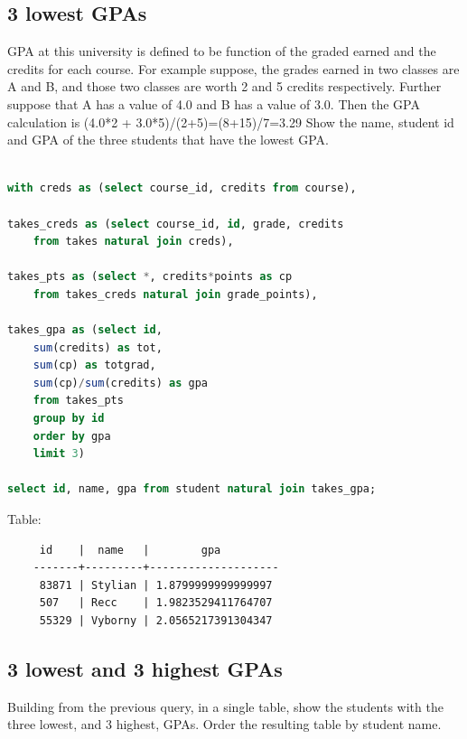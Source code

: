 \documentclass[11pt, oneside]{amsart}   	%
\begin{document}
\subsection{3 lowest GPAs}

GPA at this university is defined to be function of the graded earned and the credits for each course. For example suppose, the grades earned in two classes are A and B, and those two classes are worth 2 and 5 credits respectively. Further suppose that A has a value of 4.0 and B has a value of 3.0. Then the GPA calculation is (4.0*2 + 3.0*5)/(2+5)=(8+15)/7=3.29 Show the name, student id and GPA of the three students that have the lowest GPA. 

\begin{lstlisting}[language=SQL]

with creds as (select course_id, credits from course),

takes_creds as (select course_id, id, grade, credits 
    from takes natural join creds), 

takes_pts as (select *, credits*points as cp 
    from takes_creds natural join grade_points),

takes_gpa as (select id, 
    sum(credits) as tot, 
    sum(cp) as totgrad, 
    sum(cp)/sum(credits) as gpa 
    from takes_pts 
    group by id
    order by gpa
    limit 3)

select id, name, gpa from student natural join takes_gpa;

\end{lstlisting}

Table: 
\begin{verbatim}
     id    |  name   |        gpa
    -------+---------+--------------------
     83871 | Stylian | 1.8799999999999997
     507   | Recc    | 1.9823529411764707
     55329 | Vyborny | 2.0565217391304347
\end{verbatim}

\subsection{3 lowest and 3 highest GPAs}

Building from the previous query, in a single table, show the students with the three lowest, and 3 highest, GPAs. Order the resulting table by student name.
\end{document}
